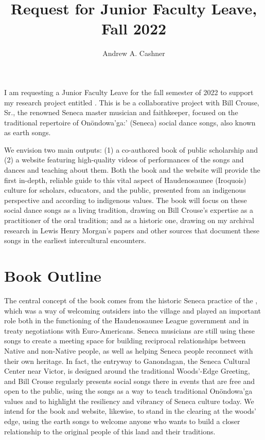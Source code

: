 \documentclass[12pt]{article}
\title{Request for Junior Faculty Leave, Fall 2022}
\author{Andrew A. Cashner}
\begin{document}
\maketitle

I am requesting a Junior Faculty Leave for the fall semester of 2022 to
support my research project entitled .
This is be a collaborative project with Bill Crouse, Sr., the renowned
Seneca master musician and faithkeeper, focused on the traditional repertoire
of Onöndowa'ga:' (Seneca) social dance songs, also known as earth songs.

We envision two main outputs: (1) a co-authored book of public scholarship and
(2) a website featuring high-quality videos of performances of the songs and
dances and teaching about them.
Both the book and the website will provide the first in-depth, reliable
guide to this vital aspect of Haudenosaunee (Iroquois) culture for scholars,
educators, and the public, presented from an indigenous perspective and
according to indigenous values.  
The book will focus on these social dance songs as a living tradition, drawing
on Bill Crouse’s expertise as a practitioner of the oral tradition; and as a
historic one, drawing on my archival research in Lewis Henry Morgan’s papers
and other sources that document these songs in the earliest intercultural
encounters. 

\section{Book Outline}

The central concept of the book comes from the historic Seneca practice of the
, which was a way of welcoming outsiders into the
village and played an important role both in the functioning of the
Haudenosaunee League government and in treaty negotiations with
Euro-Americans.%
\Autocite{Richter:Ordeal}
Seneca musicians are still using these songs to create a meeting space for
building reciprocal relationships between Native and non-Native people, as
well as helping Seneca people reconnect with their own heritage.
In fact, the entryway to Ganondagan, the Seneca Cultural Center near Victor,
is designed around the traditional Woods'-Edge Greeting, and Bill Crouse
regularly presents social songs there in events that are free and open to the
public, using the songs as a way to teach traditional Onöndowa'ga values and
to highlight the resiliency and vibrancy of Seneca culture today.
We intend for the book and website, likewise, to stand in the clearing at the
woods' edge, using the earth songs to welcome anyone who wants to build a
closer relationship to the original people of this land and their traditions.
\end{document}
